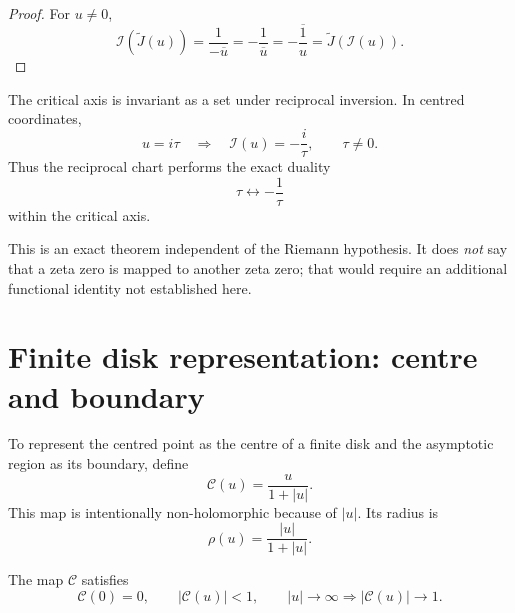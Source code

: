 \begin{proof}
For $u\neq0$,
\begin{equation}
\mathcal I(\widetilde J(u))
=
\frac1{-\overline u}
=
-\frac1{\overline u}
=
-\overline{\frac1u}
=
\widetilde J(\mathcal I(u)).
\end{equation}
\end{proof}

\begin{corollary}
\label{cor:critical-axis-inversion}
The critical axis is invariant as a set under reciprocal inversion.  In centred coordinates,
\begin{equation}
u=i\tau
\quad\Longrightarrow\quad
\mathcal I(u)
=
-\frac{i}{\tau},
\qquad \tau\neq0.
\label{eq:critical-inverse}
\end{equation}
Thus the reciprocal chart performs the exact duality
\begin{equation}
\tau\longleftrightarrow-\frac1\tau
\end{equation}
within the critical axis.
\end{corollary}

This is an exact theorem independent of the Riemann hypothesis.  It does \emph{not} say that a zeta zero is mapped to another zeta zero; that would require an additional functional identity not established here.

\section{Finite disk representation: centre and boundary}
To represent the centred point as the centre of a finite disk and the asymptotic region as its boundary, define
\begin{equation}
\mathcal C(u)=\frac{u}{1+|u|}.
\label{eq:radial-compactification}
\end{equation}
This map is intentionally non-holomorphic because of $|u|$.  Its radius is
\begin{equation}
\rho(u)=\frac{|u|}{1+|u|}.
\label{eq:compact-radius}
\end{equation}

\begin{proposition}
\label{prop:center-boundary}
The map $\mathcal C$ satisfies
\begin{equation}
\mathcal C(0)=0,
\qquad
|\mathcal C(u)|<1,
\qquad
|u|\to\infty\Longrightarrow|\mathcal C(u)|\to1.
\end{equation}
\end{proposition}

